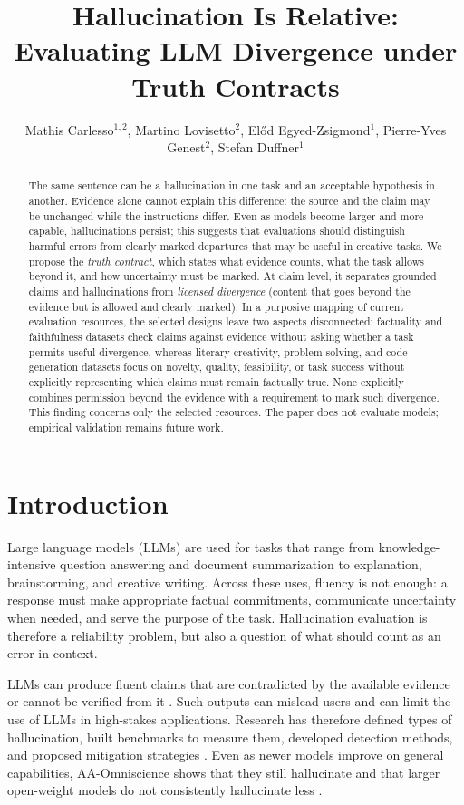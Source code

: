 \documentclass{clv2025}
\title{Hallucination Is Relative:
Evaluating LLM Divergence under Truth Contracts}
\author{Mathis Carlesso$^{1,2}$, Martino Lovisetto$^{2}$, El\H{o}d Egyed-Zsigmond$^{1}$, Pierre-Yves Genest$^{2}$, Stefan Duffner$^{1}$}
\affil{INSA Lyon, CNRS, LIRIS, UMR5205, Universit\'e Claude Bernard Lyon 1, 69621 Villeurbanne, France\\
  \quad \email{mathis.carlesso@insa-lyon.fr}}
\affil{Alteca, 69100 Villeurbanne, France}
\begin{document}
\maketitle

\begin{abstract}
The same sentence can be a hallucination in one task and an acceptable
hypothesis in another. Evidence alone cannot explain this difference: the
source and the claim may be unchanged while the instructions differ. Even as
models become larger and more capable, hallucinations persist; this
suggests that evaluations should distinguish harmful errors from clearly marked
departures that may be useful in creative tasks. We propose the
\emph{truth contract}, which states what evidence counts, what the
task allows beyond it, and how uncertainty must be marked. At claim level, it
separates grounded claims and hallucinations from \emph{licensed
divergence} (content that goes beyond the evidence but is allowed and clearly
marked). In a purposive mapping of current evaluation resources, the selected
designs leave two aspects disconnected: factuality and faithfulness datasets
check claims against evidence without asking whether a task permits useful
divergence, whereas literary-creativity, problem-solving, and code-generation
datasets focus on novelty, quality, feasibility, or task success without
explicitly representing which claims must remain factually true. None explicitly
combines permission beyond the evidence with a requirement to mark such
divergence. This finding concerns only the selected resources. The paper
does not evaluate models; empirical validation remains future work.
\end{abstract}

\section{Introduction}\label{sec:intro}

Large language models (LLMs) are used for tasks that range from knowledge-intensive
question answering and document summarization to explanation, brainstorming, and
creative writing. Across these uses, fluency is not enough: a response must make
appropriate factual commitments, communicate uncertainty when needed, and serve
the purpose of the task. Hallucination evaluation is therefore a reliability
problem, but also a question of what should count as an error in context.

LLMs can produce fluent claims that are contradicted by the available evidence
or cannot be verified from it
\citep{ji_survey_2023,huang_survey_2025}.
Such outputs can mislead users and can limit the use of LLMs in high-stakes
applications. Research has therefore defined types of hallucination, built
benchmarks to measure them, developed detection methods, and proposed
mitigation strategies
\citep{ji_survey_2023,huang_survey_2025}.
Even as newer models improve on general capabilities, AA-Omniscience shows that
they still hallucinate and that larger open-weight models do not consistently
hallucinate less \citep{jackson_aaomniscience_2025}.
\end{document}
